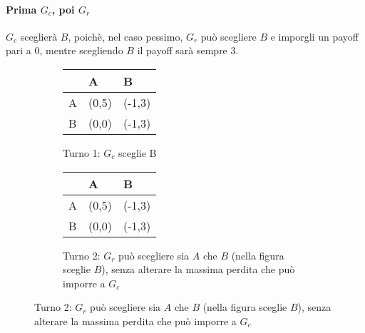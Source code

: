 \documentclass[\main/main.tex]{subfiles}
\begin{document}
\paragraph*{Prima $G_c$, poi $G_r$}
$G_c$ sceglierà $B$, poichè, nel caso pessimo, $G_r$ può scegliere $B$ e imporgli un payoff pari a $0$, mentre scegliendo $B$ il payoff sarà sempre $3$.
\begin{figure}
  \begin{subfigure}{0.24\textwidth}
    \begin{table}
      \begin{tabular}{|L|L|L|}
        \hline
          & A     & B                         \\
        \hline
        A & (0,5) &  (-1,3) \\
        \hline
        B & (0,0) & (-1,3)  \\
        \hline
      \end{tabular}
    \end{table}
    \caption{Turno 1: $G_c$ sceglie B}
  \end{subfigure}
  \begin{subfigure}{0.24\textwidth}
    \begin{table}
      \begin{tabular}{|L|L|L|}
        \hline
          & A                         & B                            \\
        \hline
        A & (0,5)                     &  (-1,3)    \\
        \hline
        B &  (0,0) &  (-1,3) \\
        \hline
      \end{tabular}
    \end{table}
    \caption{Turno 2: $G_r$ può scegliere sia $A$ che $B$ (nella figura sceglie $B$), senza alterare la massima perdita che può imporre a $G_c$}
  \end{subfigure}
\end{figure}
\end{document}
